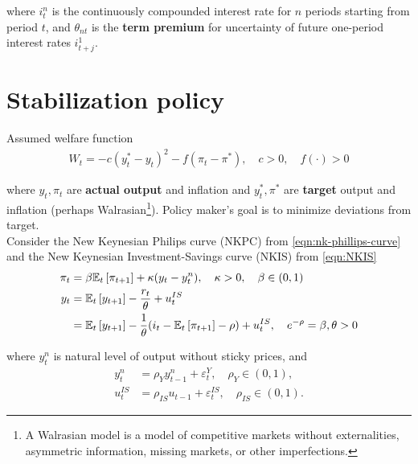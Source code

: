 \documentclass[../main.tex]{subfiles}
\begin{document}
        where $i_t^n$ is the continuously compounded interest rate for $n$ periods starting from period $t$,  and $\theta_{nt}$ is the \textbf{term premium} for uncertainty of future one-period interest rates $i^1_{t+j}$.
        
    
    \section{Stabilization policy}
    
        Assumed welfare function
        \begin{align}
            W_t = - c(y^*_t - y_t)^2  - f(\pi_t - \pi^*),
            \quad c > 0, \quad f(\cdot) > 0
        \end{align}
        
        where $y_t, \pi_t$ are \textbf{actual output} and inflation and $y^*_t, \pi^*$ are \textbf{target} output and inflation (perhaps Walrasian\footnote{A Walrasian model is a model of competitive markets without externalities, asymmetric information, missing markets, or other imperfections.}). Policy maker's goal is to minimize deviations from target. \\
        
        
        Consider the New Keynesian Philips curve (NKPC) from  \eqref{eqn:nk-phillips-curve} and the New Keynesian Investment-Savings curve (NKIS) from \eqref{eqn:NKIS}
        \begin{align}
            \pi_t
            &= \beta \mathbb{E}_t\left[\pi_{t+1}\right] + \kappa (y_t - y^n_t),
            \quad
            \kappa  > 0, \quad \beta \in (0, 1)
            \label{eqn:NKPC-2}
            \\
            y_t
            &= \mathbb{E}_t\left[y_{t+1}\right] - \frac{r_t}{\theta}
            + u_t^{IS}
            \\
            &= \mathbb{E}_t\left[y_{t+1}\right] - \frac{1}{\theta}(i_t - \mathbb{E}_t\left[\pi_{t+1}\right] -\rho) + u_t^{IS},
            \quad e^{-\rho} = \beta, \theta > 0
            \label{eqn:NKIS-2}
        \end{align}
        
        where $y^n_t$ is natural level of output without sticky prices, and
        \begin{align}
            y^n_t &= \rho_Y y^n_{t-1} + \varepsilon^Y_t,
            \quad \rho_Y \in (0, 1),
            \\
            u_t^{IS} &= \rho_{IS} u_{t-1} + \varepsilon^{IS}_t,
            \quad \rho_{IS} \in (0, 1).
        \end{align}
        
\end{document}
